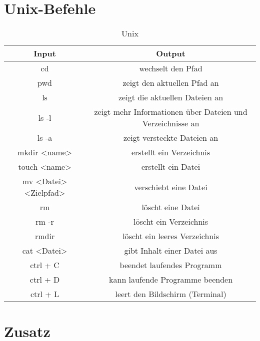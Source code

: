 \documentclass[titlepage=firstiscover]{scrartcl}
\begin{document}
  \section{Unix-Befehle}
  \begin{table}
    \centering
    \caption{Unix}
    \label{tab:unix}
      \begin{tabular} {c c}
        \toprule
        Input & Output
        \\
        \midrule
        cd & wechselt den Pfad \\
        pwd & zeigt den aktuellen Pfad an \\
        ls & zeigt die aktuellen Dateien an \\
        ls -l & zeigt mehr Informationen über Dateien und Verzeichnisse an \\
        ls -a & zeigt versteckte Dateien an \\
        mkdir <name> & erstellt ein Verzeichnis \\
        touch <name> & erstellt ein Datei \\
        mv <Datei> <Zielpfad> & verschiebt eine Datei \\
        rm & löscht eine Datei \\
        rm -r & löscht ein Verzeichnis \\
        rmdir & löscht ein leeres Verzeichnis \\
        cat <Datei> & gibt Inhalt einer Datei aus \\
        ctrl + C & beendet laufendes Programm \\
        ctrl + D & kann laufende Programme beenden \\
        ctrl + L & leert den Bildschirm (Terminal) \\
        \bottomrule
      \end{tabular}
  \end{table}

\section{Zusatz}
\end{document}
